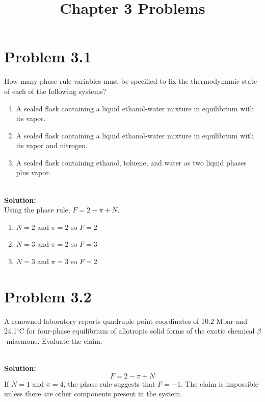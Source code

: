 \documentclass{article}
\title{Chapter 3 Problems}
\newenvironment{solution}{\par\noindent\textbf{\\Solution:\\}}{\par\medskip}
\begin{document}
\maketitle
\tableofcontents

\section*{Problem 3.1}
How many phase rule variables must be specified to fix the thermodynamic state of each of the following systems?
\begin{enumerate}[label=(\alph*)]
      \item A sealed flask containing a liquid ethanol-water mixture in equilibrium with its vapor.
      \item A sealed flask containing a liquid ethanol-water mixture in equilibrium with its vapor and nitrogen.
      \item A sealed flask containing ethanol, toluene, and water as two liquid phases plus vapor.
\end{enumerate}

\begin{solution}
Using the phase rule, $F=2-\pi+N$.
\begin{enumerate}[label=(\alph*)]
      \item $N=2$ and $\pi=2$ so $\boxed{ F=2 }$
      \item $N=3$ and $\pi=2$ so $\boxed{ F=3 }$
      \item $N=3$ and $\pi=3$ so $\boxed{ F=2 }$
\end{enumerate}
\end{solution}

\section*{Problem 3.2}
A renowned laboratory reports quadruple-point coordinates of 10.2 Mbar and 24.1$^\circ$C for four-phase equilibrium of allotropic solid forms of the exotic chemical $\beta$-miasmone. Evaluate the claim.

\begin{solution}
\begin{equation*}
      F=2-\pi+N
\end{equation*}
If $N=1$ and $\pi=4$, the phase rule suggests that $F=-1$. The claim is impossible unless there are other components present in the system.
\end{solution}
\end{document}
